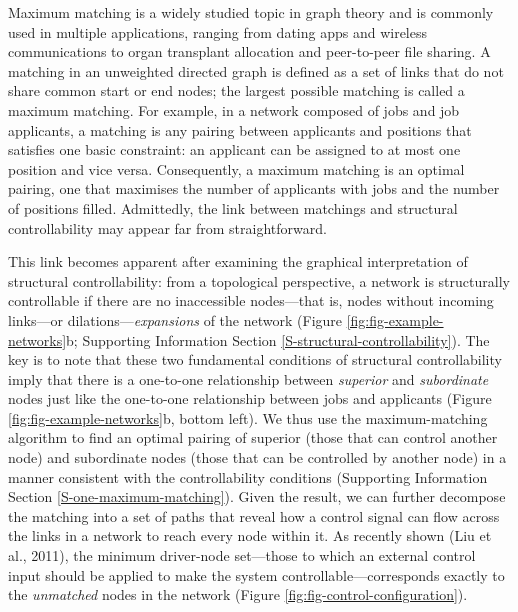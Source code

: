\documentclass[a4paper]{artikel1}
\theoremstyle{definition}
\theoremstyle{definition}
\theoremstyle{definition}
\theoremstyle{remark}
\begin{document}
Maximum matching is a widely studied topic in graph theory and is
commonly used in multiple applications, ranging from dating apps and
wireless communications to organ transplant allocation and peer-to-peer
file sharing. A matching in an unweighted directed graph is defined as a
set of links that do not share common start or end nodes; the largest
possible matching is called a maximum matching. For example, in a
network composed of jobs and job applicants, a matching is any pairing
between applicants and positions that satisfies one basic constraint: an
applicant can be assigned to at most one position and vice versa.
Consequently, a maximum matching is an optimal pairing, one that
maximises the number of applicants with jobs and the number of positions
filled. Admittedly, the link between matchings and structural
controllability may appear far from straightforward.

This link becomes apparent after examining the graphical interpretation
of structural controllability: from a topological perspective, a network
is structurally controllable if there are no inaccessible nodes---that
is, nodes without incoming links---or dilations---\emph{expansions} of
the network (Figure \ref{fig:fig-example-networks}b; Supporting
Information Section \ref{S-structural-controllability}). The key is to
note that these two fundamental conditions of structural controllability
imply that there is a one-to-one relationship between \emph{superior}
and \emph{subordinate} nodes just like the one-to-one relationship
between jobs and applicants (Figure \ref{fig:fig-example-networks}b,
bottom left). We thus use the maximum-matching algorithm to find an
optimal pairing of superior (those that can control another node) and
subordinate nodes (those that can be controlled by another node) in a
manner consistent with the controllability conditions (Supporting
Information Section \ref{S-one-maximum-matching}). Given the result, we
can further decompose the matching into a set of paths that reveal how a
control signal can flow across the links in a network to reach every
node within it. As recently shown (Liu et al., 2011), the minimum
driver-node set---those to which an external control input should be
applied to make the system controllable---corresponds exactly to the
\emph{unmatched} nodes in the network (Figure
\ref{fig:fig-control-configuration}).
\end{document}
